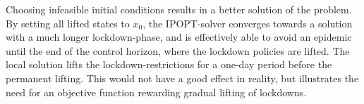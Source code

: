 Choosing infeasible initial conditions results in a better solution of the problem. By setting all lifted states to $x_0$, the IPOPT-solver converges towards a solution with a much longer lockdown-phase, and is effectively able to avoid an epidemic until the end of the control horizon, where the lockdown policies are lifted. The local solution lifts the lockdown-restrictions for a one-day period before the permanent lifting. This would not have a good effect in reality, but illustrates the need for an objective function rewarding gradual lifting of lockdowns. 


